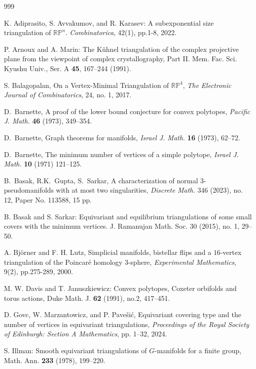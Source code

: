 \documentclass[11pt]{amsart}
\numberwithin{equation}{section}
\theoremstyle{definition}
\newcommand{\RP}{\mathbb{RP}}
\begin{document}
\begin{thebibliography}{999}

 K. Adiprasito, S. Avvakumov, and R. Karasev:
 A subexponential size triangulation of $\RP^n$.
 {\em Combinatorica}, 42(1), pp.1-8, 2022.

 P. Arnoux and A. Marin:
 The K\"{u}hnel triangulation of the complex projective
 plane from the viewpoint of complex crystallography, Part II.
 Mem. Fac. Sci. Kyushu Univ., Ser. A {\bf 45}, 167--244 (1991).


S. Balagopalan, On a Vertex-Minimal Triangulation of $\mathbb{RP}^4$, {\em The Electronic Journal of Combinatorics}, 24, no. 1, 2017.
 

 D.~Barnette, A proof of the lower bound conjecture for convex polytopes, {\em Pacific J. Math.} {\bf 46} (1973), 349--354.
  
   D.~Barnette, Graph theorems for manifolds, {\em Israel J. Math.} {\bf 16} (1973), 62--72.
  
   D.~Barnette,  The minimum number of vertices of a simple polytope, {\em Israel J. Math.} {\bf 10} (1971) 121--125.

   B.~Basak, R.K.~Gupta, S.~Sarkar,  A characterization of normal $3$-pseudomanifolds with at most two singularities, {\em Discrete Math.} 346 (2023), no. 12, Paper No. 113588, 15 pp.

 B. Basak and S. Sarkar:
 Equivariant and equilibrium triangulations of some
 small covers with the minimum vertices. J. Ramanujan Math. Soc. 30 (2015), no. 1, 29--50.

A. Björner and F. H. Lutz, Simplicial manifolds, bistellar flips and a $16$-vertex triangulation of the Poincaré homology $3$-sphere, {\em Experimental Mathematics}, 9(2), pp.275-289, 2000.


 M. W. Davis and T. Januszkiewicz:
 Convex polytopes, Coxeter orbifolds and torus actions,
 Duke Math. J. {\bf 62} (1991), no.2, 417--451.

D. Govc, W. Marzantowicz, and P. Pavešić, Equivariant covering type and the number of vertices in equivariant triangulations, {\em Proceedings of the Royal Society of Edinburgh: Section A Mathematics}, pp. 1–32, 2024.

 S. Illman:
 Smooth equivariant triangulations of $G$-manifolds for a finite group,
 Math. Ann. {\bf 233} (1978), 199--220.


\end{thebibliography}
\end{document}
